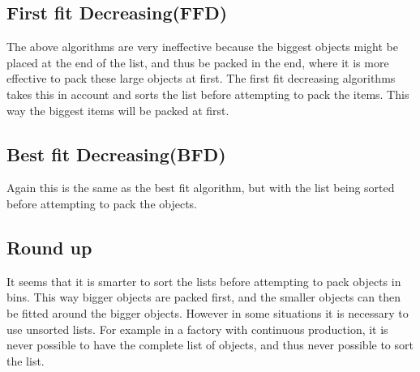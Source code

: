 \subsection{First fit Decreasing(FFD)}
The above algorithms are very ineffective because the biggest objects might be placed at the end of the list, and thus be packed in the end, where it is more effective to pack these large objects at first.
The first fit decreasing algorithms takes this in account and sorts the list before attempting to pack the items. This way the biggest items will be packed at first.

\subsection{Best fit Decreasing(BFD)}
Again this is the same as the best fit algorithm, but with the list being sorted before attempting to pack the objects.

\subsection{Round up}
It seems that it is smarter to sort the lists before attempting to pack objects in bins. This way bigger objects are packed first, and the smaller objects can then be fitted around the bigger objects. However in some situations it is necessary to use unsorted lists. For example in a factory with continuous production, it is never possible to have the complete list of objects, and thus never possible to sort the list.
